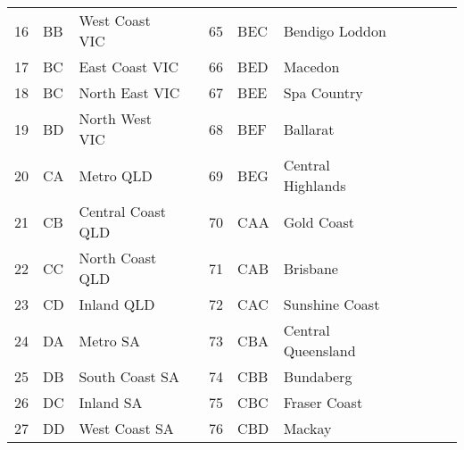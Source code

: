 \begin{table}
{\begin{tabular}{lllllllllll}
				16	& BB & West Coast VIC		&  & 65  & BEC & Bendigo Loddon &&&&\\
				17	& BC & East Coast VIC		&  & 66  & BED & Macedon &&&&\\ 
				18	& BC & North East VIC		&  & 67  & BEE & Spa Country &&&&\\ 
				19	& BD & North West VIC		&  & 68  & BEF & Ballarat &&&&\\
				20  & CA & Metro QLD			&  & 69  & BEG & Central Highlands &&&&\\
				21  & CB & Central Coast QLD	&  & 70  & CAA & Gold Coast &&&&\\
				22  & CC & North Coast QLD		&  & 71  & CAB & Brisbane &&&&\\
				23  & CD & Inland QLD			&  & 72  & CAC & Sunshine Coast &&&&\\
				24	& DA & Metro SA				&  & 73  & CBA & Central Queensland &&&&\\	
				25	& DB & South Coast SA		&  & 74  & CBB & Bundaberg &&&&\\	
				26	& DC & Inland SA			&  & 75  & CBC & Fraser Coast &&&&\\	
				27	& DD & West Coast SA		&  & 76  & CBD & Mackay &&&&\\	
				

\end{tabular}}
\end{table}
